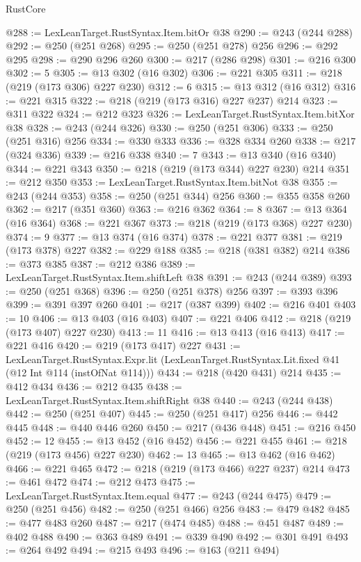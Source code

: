 \begin{lexlean}{RustCore}
\begin{coremodule}
@288 := LexLeanTarget.RustSyntax.Item.bitOr @38
@290 := @243 (@244 @288)
@292 := @250 (@251 @268)
@295 := @250 (@251 @278) @256
@296 := @292 @295
@298 := @290 @296 @260
@300 := @217 (@286 @298)
@301 := @216 @300
@302 := 5
@305 := @13 @302 (@16 @302)
@306 := @221 @305
@311 := @218 (@219 (@173 @306) @227 @230)
@312 := 6
@315 := @13 @312 (@16 @312)
@316 := @221 @315
@322 := @218 (@219 (@173 @316) @227 @237) @214
@323 := @311 @322
@324 := @212 @323
@326 := LexLeanTarget.RustSyntax.Item.bitXor @38
@328 := @243 (@244 @326)
@330 := @250 (@251 @306)
@333 := @250 (@251 @316) @256
@334 := @330 @333
@336 := @328 @334 @260
@338 := @217 (@324 @336)
@339 := @216 @338
@340 := 7
@343 := @13 @340 (@16 @340)
@344 := @221 @343
@350 := @218 (@219 (@173 @344) @227 @230) @214
@351 := @212 @350
@353 := LexLeanTarget.RustSyntax.Item.bitNot @38
@355 := @243 (@244 @353)
@358 := @250 (@251 @344) @256
@360 := @355 @358 @260
@362 := @217 (@351 @360)
@363 := @216 @362
@364 := 8
@367 := @13 @364 (@16 @364)
@368 := @221 @367
@373 := @218 (@219 (@173 @368) @227 @230)
@374 := 9
@377 := @13 @374 (@16 @374)
@378 := @221 @377
@381 := @219 (@173 @378) @227
@382 := @229 @188
@385 := @218 (@381 @382) @214
@386 := @373 @385
@387 := @212 @386
@389 := LexLeanTarget.RustSyntax.Item.shiftLeft @38
@391 := @243 (@244 @389)
@393 := @250 (@251 @368)
@396 := @250 (@251 @378) @256
@397 := @393 @396
@399 := @391 @397 @260
@401 := @217 (@387 @399)
@402 := @216 @401
@403 := 10
@406 := @13 @403 (@16 @403)
@407 := @221 @406
@412 := @218 (@219 (@173 @407) @227 @230)
@413 := 11
@416 := @13 @413 (@16 @413)
@417 := @221 @416
@420 := @219 (@173 @417) @227
@431 := LexLeanTarget.RustSyntax.Expr.lit
    (LexLeanTarget.RustSyntax.Lit.fixed @41 (@12 Int @114 (instOfNat @114)))
@434 := @218 (@420 @431) @214
@435 := @412 @434
@436 := @212 @435
@438 := LexLeanTarget.RustSyntax.Item.shiftRight @38
@440 := @243 (@244 @438)
@442 := @250 (@251 @407)
@445 := @250 (@251 @417) @256
@446 := @442 @445
@448 := @440 @446 @260
@450 := @217 (@436 @448)
@451 := @216 @450
@452 := 12
@455 := @13 @452 (@16 @452)
@456 := @221 @455
@461 := @218 (@219 (@173 @456) @227 @230)
@462 := 13
@465 := @13 @462 (@16 @462)
@466 := @221 @465
@472 := @218 (@219 (@173 @466) @227 @237) @214
@473 := @461 @472
@474 := @212 @473
@475 := LexLeanTarget.RustSyntax.Item.equal
@477 := @243 (@244 @475)
@479 := @250 (@251 @456)
@482 := @250 (@251 @466) @256
@483 := @479 @482
@485 := @477 @483 @260
@487 := @217 (@474 @485)
@488 := @451 @487
@489 := @402 @488
@490 := @363 @489
@491 := @339 @490
@492 := @301 @491
@493 := @264 @492
@494 := @215 @493
@496 := @163 (@211 @494)

\end{coremodule}
\end{lexlean}
